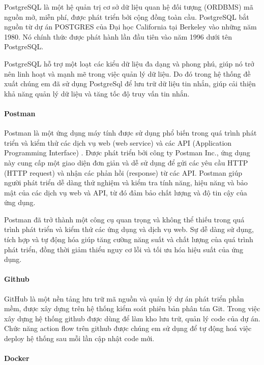 PostgreSQL là một hệ quản trị cơ sở dữ liệu quan hệ đối tượng (ORDBMS) mã nguồn mở, miễn phí, được phát triển bởi cộng đồng toàn cầu. PostgreSQL bắt nguồn từ dự án POSTGRES của Đại học California tại Berkeley vào những năm 1980. Nó chính thức được phát hành lần đầu tiên vào năm 1996 dưới tên PostgreSQL.

PostgreSQL hỗ trợ một loạt các kiểu dữ liệu đa dạng và phong phú, giúp nó trở nên linh hoạt và mạnh mẽ trong việc quản lý dữ liệu. Do đó trong hệ thống đề xuất chúng em đã sử dụng PostgreSql để lưu trữ dữ liệu tin nhắn, giúp cải thiện khả năng quản lý dữ liệu và tăng tốc độ truy vấn tin nhắn.
\paragraph{Postman}
\mbox{}

Postman là một ứng dụng máy tính được sử dụng phổ biến trong quá trình phát triển và kiểm thử các dịch vụ web (web service) và các API (Application Programming Interface) \cite{postman_1}. Được phát triển bởi công ty Postman Inc., ứng dụng này cung cấp một giao diện đơn giản và dễ sử dụng để gửi các yêu cầu HTTP (HTTP request) và nhận các phản hồi (response) từ các API. Postman giúp người phát triển dễ dàng thử nghiệm và kiểm tra tính năng, hiệu năng và bảo mật của các dịch vụ web và API, từ đó đảm bảo chất lượng và độ tin cậy của ứng dụng.

Postman đã trở thành một công cụ quan trọng và không thể thiếu trong quá trình phát triển và kiểm thử các ứng dụng và dịch vụ web. Sự dễ dàng sử dụng, tích hợp và tự động hóa giúp tăng cường năng suất và chất lượng của quá trình phát triển, đồng thời giảm thiểu nguy cơ lỗi và tối ưu hóa hiệu suất của ứng dụng.

\paragraph{Github}
\mbox{}

GitHub là một nền tảng lưu trữ mã nguồn và quản lý dự án phát triển phần mềm, được xây dựng trên hệ thống kiểm soát phiên bản phân tán Git. Trong việc xây dựng hệ thống github được dùng để làm kho lưu trữ, quản lý code của dự án. Chức năng action flow trên github được chúng em sử dụng để tự động hoá việc deploy hệ thống sau mỗi lần cập nhật code mới.

\paragraph{Docker}
\mbox{}

